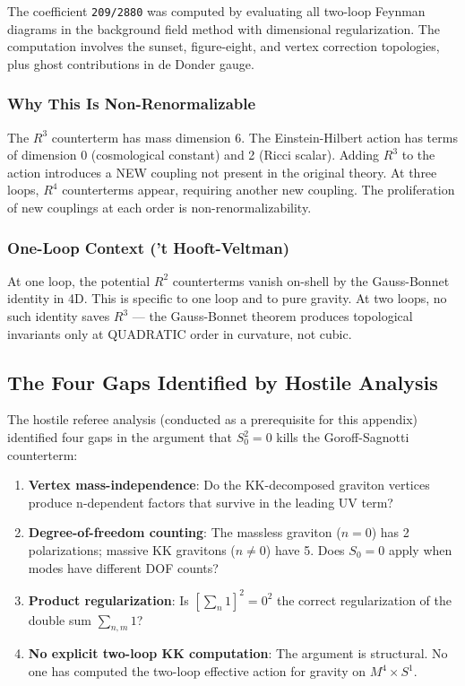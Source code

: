 \documentclass[aps,prd,preprint,superscriptaddress,longbibliography,floatfix]{revtex4-2}
\theoremstyle{remark}
\begin{document}
The coefficient \texttt{209/2880} was computed by evaluating all two-loop Feynman diagrams in the background field method with dimensional regularization. The computation involves the sunset, figure-eight, and vertex correction topologies, plus ghost contributions in de Donder gauge.


\subsubsection{Why This Is Non-Renormalizable}

The $R^{3}$ counterterm has mass dimension 6. The Einstein-Hilbert action has terms of dimension 0 (cosmological constant) and 2 (Ricci scalar). Adding $R^{3}$ to the action introduces a NEW coupling not present in the original theory. At three loops, $R^{4}$ counterterms appear, requiring another new coupling. The proliferation of new couplings at each order is non-renormalizability.


\subsubsection{One-Loop Context ('t Hooft-Veltman)}

At one loop, the potential $R^{2}$ counterterms vanish on-shell by the Gauss-Bonnet identity in 4D. This is specific to one loop and to pure gravity. At two loops, no such identity saves $R^{3}$ --- the Gauss-Bonnet theorem produces topological invariants only at QUADRATIC order in curvature, not cubic.



\subsection{The Four Gaps Identified by Hostile Analysis}

The hostile referee analysis (conducted as a prerequisite for this appendix) identified four gaps in the argument that $S_{0}^{2} = 0$ kills the Goroff-Sagnotti counterterm:


\begin{enumerate}
  \item \textbf{Vertex mass-independence}: Do the KK-decomposed graviton vertices produce n-dependent factors that survive in the leading UV term?
  \item \textbf{Degree-of-freedom counting}: The massless graviton ($n = 0$) has 2 polarizations; massive KK gravitons ($n \neq 0$) have 5. Does $S_{0} = 0$ apply when modes have different DOF counts?
  \item \textbf{Product regularization}: Is $[\sum_n 1]^{2} = 0^{2}$ the correct regularization of the double sum $\sum_{n,m} 1$?
  \item \textbf{No explicit two-loop KK computation}: The argument is structural. No one has computed the two-loop effective action for gravity on $M^{4} \times S^{1}$.
\end{enumerate}
\end{document}
